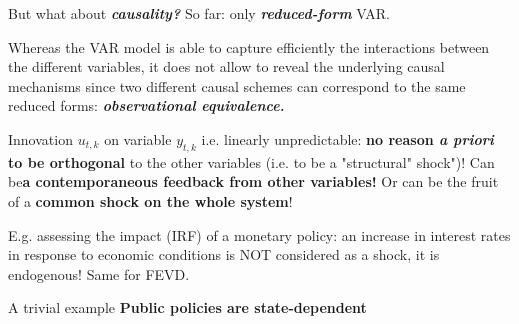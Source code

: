 \documentclass{beamer}
\begin{document}
\begin{frame}{But what about \textit{\textbf{causality?}}}
So far: only \textit{\textbf{reduced-form}} VAR.
\medskip

Whereas the VAR model is able to capture efficiently the interactions between the different variables, it does not allow to reveal the underlying causal mechanisms since two different causal schemes can correspond to the same reduced forms: \textbf{\textit{observational equivalence.}}
\medskip

Innovation $u_{t,k}$ on variable $y_{t,k}$ i.e. linearly unpredictable:\textbf{ no reason \textit{a priori} to be orthogonal} to the other variables (i.e. to be a "structural" shock")! Can be\textbf{a contemporaneous feedback from other variables!} Or can be the fruit of a \textbf{common shock on the whole system}!
\medskip

E.g. assessing the impact (IRF) of a monetary policy: an increase in interest rates in response to economic conditions is NOT considered as a shock, it is endogenous! Same for FEVD.
\end{frame}



\begin{frame}{A trivial example}
\textbf{Public policies are state-dependent}

\end{frame}
\end{document}
